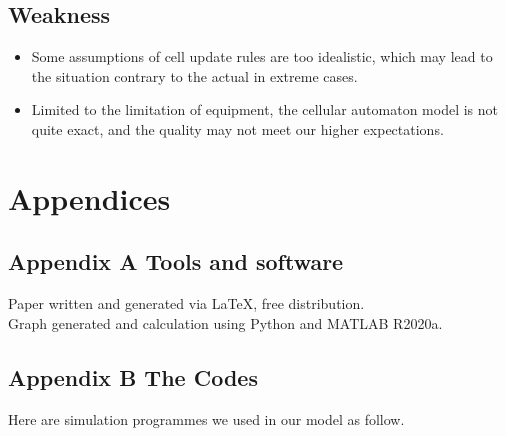 \documentclass{mcmthesis}		    %
\begin{document}
	\subsection{Weakness}
	\begin{itemize}
	    \item Some assumptions of cell update rules are too idealistic, which may lead to the situation contrary to the actual in extreme cases. 
	    \item Limited to the limitation of equipment, the cellular automaton model is not quite exact, and the quality may not meet our higher expectations.
	    
	   
	\end{itemize}
    


\section*{Appendices}
\subsection*{Appendix A Tools and software}
Paper written and generated via \LaTeX, free distribution.\\\indent Graph generated and calculation using Python and MATLAB R2020a.
\subsection*{Appendix B The Codes}
Here are simulation programmes we used in our model as follow.

\end{document}
